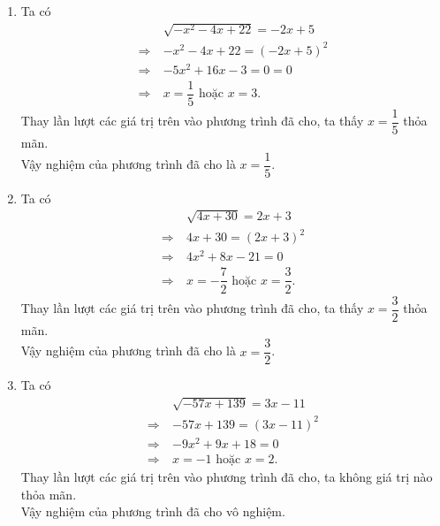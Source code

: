 \begin{bt}
{\begin{enumerate}
			Vậy nghiệm của phương trình đã cho  là $x=-\dfrac{6}{11}$ và $x=\dfrac{2}{3}$.
			\item   Ta có
			\begin{align*}
				&\sqrt{-x^{2}-4 x+22}=-2 x+5\\
				\Rightarrow~&-x^{2}-4 x+22 = (-2 x+5)^2 \\
				\Rightarrow~& -5 x^{2}+16 x-3=0=0 \\
				\Rightarrow~ & x=\dfrac{1}{5} \text { hoặc } x=3.
			\end{align*}
			Thay lần lượt các giá trị trên vào phương trình đã cho, ta thấy $x=\dfrac{1}{5}$ thỏa mãn. \\
			Vậy nghiệm của phương trình đã cho  là $x=\dfrac{1}{5}$.
			\item Ta có
			\begin{align*}
				&\sqrt{4 x+30}=2 x+3\\
				\Rightarrow~&4 x+30 = (2 x+3)^2 \\
				\Rightarrow~& 4x^{2}+8 x-21=0 \\
				\Rightarrow~ & x=-\dfrac{7}{2} \text { hoặc } x=\dfrac{3}{2}.
			\end{align*}
			Thay lần lượt các giá trị trên vào phương trình đã cho, ta thấy $x=\dfrac{3}{2}$ thỏa mãn. \\
			Vậy nghiệm của phương trình đã cho  là $x=\dfrac{3}{2}$.
			\item Ta có
			\begin{align*}
				&\sqrt{-57 x+139}=3 x-11\\
				\Rightarrow~&-57 x+139 = (3 x-11)^2 \\
				\Rightarrow~& -9 x^2+9 x+18=0 \\
				\Rightarrow~ & x=-1 \text { hoặc } x=2.
			\end{align*}
			Thay lần lượt các giá trị trên vào phương trình đã cho, ta không giá trị nào  thỏa mãn. \\
			Vậy nghiệm của phương trình đã cho  vô nghiệm.
		\end{enumerate}
	}
\end{bt}

